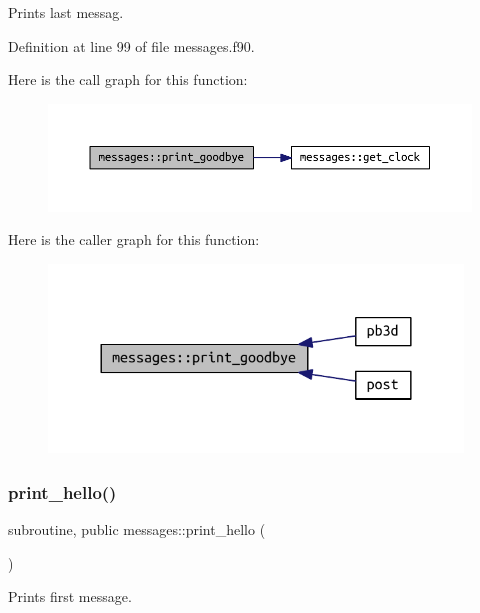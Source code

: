 Prints last messag. 



Definition at line 99 of file messages.\+f90.

Here is the call graph for this function\+:\nopagebreak
\begin{figure}[H]
\begin{center}
\leavevmode
\includegraphics[width=350pt]{namespacemessages_a5d3f456913230bdf985c363e8cee8489_cgraph}
\end{center}
\end{figure}
Here is the caller graph for this function\+:\nopagebreak
\begin{figure}[H]
\begin{center}
\leavevmode
\includegraphics[width=312pt]{namespacemessages_a5d3f456913230bdf985c363e8cee8489_icgraph}
\end{center}
\end{figure}
\mbox{\label{namespacemessages_a60c95b4c352b0087f32ef87279da49ca}} 
\subsubsection{\texorpdfstring{print\+\_\+hello()}{print\_hello()}}
{\footnotesize\ttfamily subroutine, public messages\+::print\+\_\+hello (\begin{DoxyParamCaption}{ }\end{DoxyParamCaption})}



Prints first message. 



